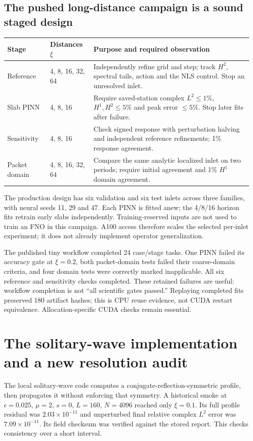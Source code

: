 \documentclass[11pt]{article}
\begin{document}
\subsection{The pushed long-distance campaign is a sound staged design}
\begin{center}\small
\begin{tabular}{p{}p{}p{}}\toprule
Stage & Distances $\xi$ & Purpose and required observation\\\midrule
Reference & 4, 8, 16, 32, 64 & Independently refine grid and step; track $H^2$,
spectral tails, action and the NLS control. Stop an unresolved inlet.\\
Slab PINN & 4, 8, 16 & Require saved-station complex $L^2\leq1\%$, $H^1,H^2\leq5\%$
and peak error $\leq5\%$. Stop later fits after failure.\\
Sensitivity & 4, 8, 16 & Check signed response with perturbation halving and
independent reference refinements; 1\% response agreement.\\
Packet domain & 4, 8, 16, 32, 64 & Compare the same analytic localized inlet on
two periods; require initial agreement and 1\% $H^1$ domain agreement.\\\bottomrule
\end{tabular}
\end{center}
The production design has six validation and six test inlets across three
families, with neural seeds 11, 29 and 47. Each PINN is fitted anew; the
4/8/16 horizon fits retrain early slabs independently. Training-reserved inputs
are not used to train an FNO in this campaign. A100 access therefore scales the
selected per-inlet experiment; it does not already implement operator generalization.

The published tiny workflow completed 24 case/stage tasks. One PINN failed its
accuracy gate at $\xi=0.2$, both packet-domain tests failed their coarse-domain
criteria, and four domain tests were correctly marked inapplicable. All six
reference and sensitivity checks completed. These retained failures are useful:
workflow completion is not ``all scientific gates passed.'' Replaying completed
fits preserved 180 artifact hashes; this is CPU reuse evidence, not CUDA restart
equivalence. Allocation-specific CUDA checks remain essential.

\newpage
\section{The solitary-wave implementation and a new resolution audit}\label{sec:projection}
The local solitary-wave code computes a conjugate-reflection-symmetric profile,
then propagates it without enforcing that symmetry. A historical smoke at
$\epsilon=0.025$, $\mu=2$, $s=0$, $L=160$, $N=4096$ reached only $\xi=0.1$.
Its full profile residual was $2.03\times10^{-11}$ and unperturbed final relative
complex $L^2$ error was $7.09\times10^{-11}$. Its field checksum was verified
against the stored report. This checks consistency over a short interval.
\end{document}
